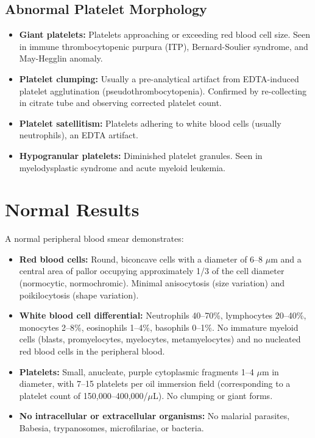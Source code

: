 \subsection*{Abnormal Platelet Morphology}
\begin{itemize}
  \item \textbf{Giant platelets:} Platelets approaching or exceeding red blood cell size. Seen in immune thrombocytopenic purpura (ITP), Bernard-Soulier syndrome, and May-Hegglin anomaly.
  \item \textbf{Platelet clumping:} Usually a pre-analytical artifact from EDTA-induced platelet agglutination (pseudothrombocytopenia). Confirmed by re-collecting in citrate tube and observing corrected platelet count.
  \item \textbf{Platelet satellitism:} Platelets adhering to white blood cells (usually neutrophils), an EDTA artifact.
  \item \textbf{Hypogranular platelets:} Diminished platelet granules. Seen in myelodysplastic syndrome and acute myeloid leukemia.
\end{itemize}

\section*{Normal Results}
A normal peripheral blood smear demonstrates:
\begin{itemize}
  \item \textbf{Red blood cells:} Round, biconcave cells with a diameter of 6--8 $\mu$m and a central area of pallor occupying approximately 1/3 of the cell diameter (normocytic, normochromic). Minimal anisocytosis (size variation) and poikilocytosis (shape variation).
  \item \textbf{White blood cell differential:} Neutrophils 40--70\%, lymphocytes 20--40\%, monocytes 2--8\%, eosinophils 1--4\%, basophils 0--1\%. No immature myeloid cells (blasts, promyelocytes, myelocytes, metamyelocytes) and no nucleated red blood cells in the peripheral blood.
  \item \textbf{Platelets:} Small, anucleate, purple cytoplasmic fragments 1--4 $\mu$m in diameter, with 7--15 platelets per oil immersion field (corresponding to a platelet count of 150,000--400,000/$\mu$L). No clumping or giant forms.
  \item \textbf{No intracellular or extracellular organisms:} No malarial parasites, Babesia, trypanosomes, microfilariae, or bacteria.
\end{itemize}

